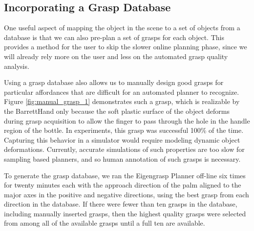 \subsection{Incorporating a Grasp Database}
One useful aspect of mapping the object in the scene to a set of objects from a database is that we can also pre-plan a set of grasps for each object. This provides a method for the user to skip the slower online planning phase, since we will already rely more on the user and less on the automated grasp quality analysis. 

Using a grasp database also allows us to manually design good grasps for particular affordances that are difficult for an automated planner to recognize. Figure \ref{fig:manual_grasp_1} demonstrates such a grasp, which is realizable by the BarrettHand only because the soft plastic surface of the object deforms during grasp acquisition to allow the finger to pass through the hole in the handle region of the bottle.  In experiments, this grasp was successful 100\% of the time.  Capturing this behavior in a simulator would require modeling dynamic object deformations. Currently, accurate simulations of such properties are too slow for sampling based planners, and so human annotation of such grasps is necessary. 

To generate the grasp database, we ran the Eigengrasp Planner off-line six times for twenty minutes each with the approach direction of the palm aligned to the major axes in the positive and negative directions, using the best grasp from each direction in the database. If there were fewer than ten grasps in the database, including manually inserted grasps, then the highest quality grasps were selected from among all of the available grasps until a full ten are available. 

